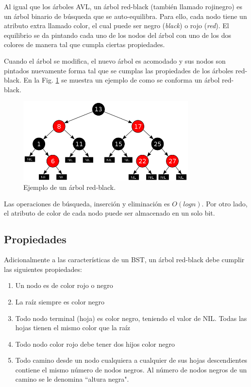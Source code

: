Al igual que los árboles AVL, un árbol red-black (también llamado rojinegro) es un árbol binario de búsqueda que se auto-equilibra. Para ello, cada nodo tiene un atributo extra llamado color, el cual puede ser negro (\textit{black}) o rojo (\textit{red}). El equilibrio se da pintando cada uno de los nodos del árbol con uno de los dos colores de manera tal que cumpla ciertas propiedades.

Cuando el árbol se modifica, el nuevo árbol es acomodado y sus nodos son pintados nuevamente forma tal que se cumplas las propiedades de los árboles red-black. En la Fig. \ref{fig:RedBlack1} se muestra un ejemplo de como se conforma un árbol red-black.

\begin{figure}[htpb!]
  \begin{center}
    \includegraphics[width=0.8\textwidth]{images/redblack.png}
  \end{center}
  \caption{Ejemplo de un árbol red-black.}
  \label{fig:RedBlack1}
\end{figure}

Las operaciones de búsqueda, inserción y eliminación es $O(logn)$. Por otro lado, el atributo de color de cada nodo puede ser almacenado en un solo bit.
\subsection{Propiedades}

Adicionalmente a las características de un BST, un árbol red-black debe cumplir las siguientes propiedades:
\begin{enumerate}
\item Un nodo es de color rojo o negro
\item La raíz siempre es color negro
\item Todo nodo terminal (hoja) es color negro, teniendo el valor de NIL. Todas las hojas tienen el mismo color que la raíz
\item Todo nodo color rojo debe tener dos hijos color negro
\item Todo camino desde un nodo cualquiera a cualquier de sus hojas descendientes contiene el mismo número de nodos negros. Al número de nodos negros de un camino se le denomina ``altura negra".
\end{enumerate}

